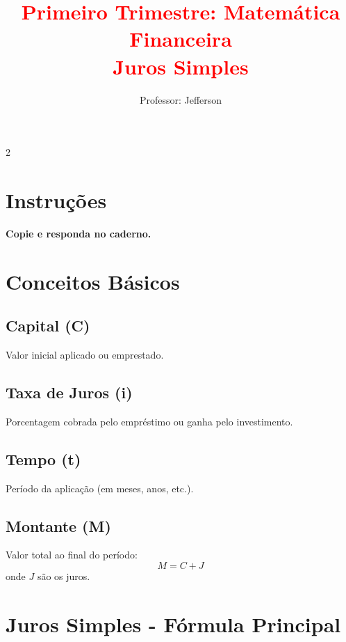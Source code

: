 \documentclass[11pt]{article}
\title{\textcolor{red}{Primeiro Trimestre: Matemática Financeira
    \\Juros Simples}}
\author{Professor: Jefferson}
\date{}
\begin{document}
\maketitle
\vspace{-1cm}


\begin{multicols}{2}

\section*{Instruções}
    \textbf{Copie e responda no caderno.}

\section*{Conceitos Básicos}

\subsection*{Capital (C)}
Valor inicial aplicado ou emprestado.

\subsection*{Taxa de Juros (i)}
Porcentagem cobrada pelo empréstimo ou ganha pelo investimento.

\subsection*{Tempo (t)}
Período da aplicação (em meses, anos, etc.).

\subsection*{Montante (M)}
Valor total ao final do período:
\[
M = C + J
\]
onde $J$ são os juros.

\section*{Juros Simples - Fórmula Principal}




\end{multicols}
\end{document}
